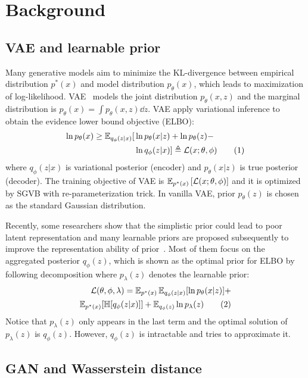 \section{Background}

\subsection{VAE and learnable prior}

Many generative models aim to minimize the KL-divergence between empirical distribution $p^*(x)$ and model distribution $p_\theta(x)$, which leads to maximization of log-likelihood. VAE~\cite{kingma2014auto} models the joint distribution $p_\theta(x, z)$ and the marginal distribution is $p_\theta(x) = \int p_\theta(x, z) \dd z$. VAE apply variational inference to obtain the evidence lower bound objective (ELBO): 
\begin{align*} \label{eq:ELBO}
\ln p_\theta(x) \geq \operatorname{\mathbb{E}}_{q_\phi(z|x)} [  &  \ln p_\theta(x|z) + \ln p_\theta(z) - \\ & \ln q_\phi(z|x) ] 
\triangleq \mathcal{L}(x; \theta, \phi) \tag{1}
\end{align*}
where $q_\phi(z|x)$ is variational posterior (encoder) and $p_\theta(x|z)$ is true posterior (decoder). The training objective of VAE is $\operatorname{\mathbb{E}}_{{p^*(x)}}\left[{\mathcal{L}(x; \theta, \phi)}\right]$ and it is optimized by SGVB with re-parameterization trick. In vanilla VAE, prior $p_\theta(z)$ is chosen as the standard Gaussian distribution. 

Recently, some researchers show that the simplistic prior could lead to poor latent representation and many learnable priors are proposed subsequently to improve the representation ability of prior~\cite{tomczak2018vae}. Most of them focus on the aggregated posterior $q_\phi(z)$, which is shown as the optimal prior for ELBO by following decomposition where $p_\lambda(z)$ denotes the learnable prior:
\begin{align*} \label{eq:second-decomposition}
\mathcal{L}(\theta, \phi, \lambda) = \operatorname{\mathbb{E}}_{p^*(x)}\operatorname{\mathbb{E}}_{q_\phi(z|x)} [ \ln p_\theta(x|z)] + \\ 
\operatorname{\mathbb{E}}_{p^*(x)}[\mathbb{H}[q_\phi(z|x)]] + \operatorname{\mathbb{E}}_{q_\phi(z)} \ln p_\lambda(z) \tag{2}
\end{align*}
Notice that $p_\lambda(z)$ only appears in the last term and the optimal solution of $p_\lambda(z)$ is $q_\phi(z)$. However, $q_\phi(z)$ is intractable and \cite{tomczak2018vae,takahashi2019variational} tries to approximate it. 

\subsection{GAN and Wasserstein distance}


